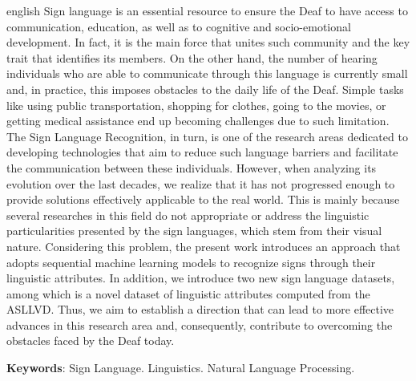 \begin{resumo}[Abstract]
  \begin{otherlanguage*}{english}
    \noindent
    Sign language is an essential resource to ensure the Deaf to have access to communication, education, as well as to cognitive and socio-emotional development. In fact, it is the main force that unites such community and the key trait that identifies its members.
    On the other hand, the number of hearing individuals who are able to communicate through this language is currently small and, in practice, this imposes obstacles to the daily life of the Deaf.
    Simple tasks like using public transportation, shopping for clothes, going to the movies, or getting medical assistance end up becoming challenges due to such limitation.
    The Sign Language Recognition, in turn, is one of the research areas dedicated to developing technologies that aim to reduce such language barriers and facilitate the communication between these individuals.
    However, when analyzing its evolution over the last decades, we realize that it has not progressed enough to provide solutions effectively applicable to the real world.
    This is mainly because several researches in this field do not appropriate or address the linguistic particularities presented by the sign languages, which stem from their visual nature.
    Considering this problem, the present work introduces an approach that adopts sequential machine learning models to recognize signs through their linguistic attributes. In addition, we introduce two new sign language datasets, among which is a novel dataset of linguistic attributes computed from the ASLLVD.
    Thus, we aim to establish a direction that can lead to more effective advances in this research area and, consequently, contribute to overcoming the obstacles faced by the Deaf today.

    \vspace{\onelineskip}

    \noindent
    \textbf{Keywords}: Sign Language. Linguistics. Natural Language Processing.
  \end{otherlanguage*}
\end{resumo}
